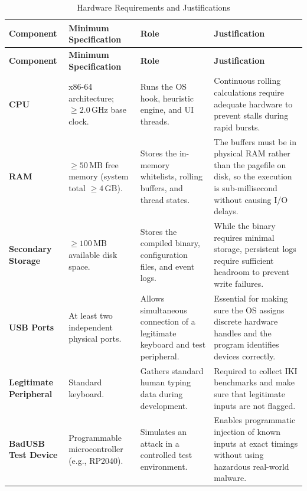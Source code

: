 	{\small
		\renewcommand{\arraystretch}{1.2}
		\begin{xltabular}{\textwidth}{@{} P{2.5cm} P{2.5cm} L L @{}}
			\caption{Hardware Requirements and Justifications} \label{tab:hardware_requirements} \\
			\toprule
			\textbf{Component} & \textbf{Minimum Specification} & \textbf{Role} & \textbf{Justification} \\
			\midrule
			\endfirsthead

			\toprule
			\textbf{Component} & \textbf{Minimum Specification} & \textbf{Role} & \textbf{Justification} \\
			\midrule
			\endhead


			\textbf{CPU} & x86-64 architecture; $\ge 2.0\,\text{GHz}$ base clock. & Runs the OS hook, heuristic engine, and UI threads. & Continuous rolling calculations require adequate hardware to prevent stalls during rapid bursts. \\

			\textbf{RAM} & $\ge 50\,\text{MB}$ free memory (system total $\ge 4\,\text{GB}$). & Stores the in-memory whitelists, rolling buffers, and thread states. & The buffers must be in physical RAM rather than the pagefile on disk, so the execution is sub-millisecond without causing I/O delays. \\

			\textbf{Secondary Storage} & $\ge 100\,\text{MB}$ available disk space. & Stores the compiled binary, configuration files, and event logs. & While the binary requires minimal storage, persistent logs require sufficient headroom to prevent write failures. \\

			\textbf{USB Ports} & At least two independent physical ports. & Allows simultaneous connection of a legitimate keyboard and test peripheral. & Essential for making sure the OS assigns discrete hardware handles and the program identifies devices correctly. \\

			\textbf{Legitimate Peripheral} & Standard keyboard. & Gathers standard human typing data during development. & Required to collect $\text{IKI}$ benchmarks and make sure that legitimate inputs are not flagged. \\

			\textbf{BadUSB Test Device} & Programmable microcontroller (e.g., RP2040). & Simulates an attack in a controlled test environment. & Enables programmatic injection of known inputs at exact timings without using hazardous real-world malware. \\
		\end{xltabular}
	}

